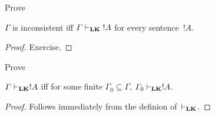 \documentclass[../../../include/open-logic-section]{subfiles}
\begin{document}
\begin{prob}
Prove 
\end{prob}

\begin{prop}
$\Gamma$ is inconsistent iff $\Gamma \Proves[\Log{LK}] {!A}$ for every
  sentence~$!A$.
\end{prop}

\begin{proof}
Exercise.
\end{proof}

\begin{prob}
Prove 
\end{prob}

\begin{prop}
$\Gamma \Proves[\Log{LK}] !A$ iff for some finite $\Gamma_0 \subseteq
\Gamma$, $\Gamma_0 \Proves[\Log{LK}] !A$.
\end{prop}

\begin{proof}
Follows immediately from the definion of~$\Proves[\Log{LK}]$.
\end{proof}
\end{document}
